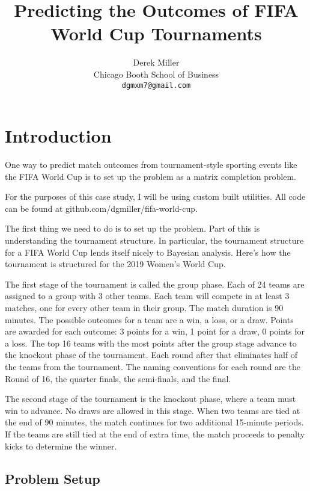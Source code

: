 \documentclass{article}
\title{Predicting the Outcomes of FIFA World Cup Tournaments}
\author{
  Derek Miller \\
  Chicago Booth School of Business\\
  \texttt{dgmxm7@gmail.com} \\
}
\begin{document}
\maketitle

\begin{abstract}
\lipsum[1]
\end{abstract}




\section{Introduction}
One way to predict match outcomes from tournament-style sporting events like the FIFA World Cup is to set up the problem as a matrix completion problem.

For the purposes of this case study, I will be using custom built utilities. All code can be found at github.com/dgmiller/fifa-world-cup.

The first thing we need to do is to set up the problem. Part of this is understanding the tournament structure. In particular, the tournament structure for a FIFA World Cup lends itself nicely to Bayesian analysis. Here's how the tournament is structured for the 2019 Women's World Cup.

The first stage of the tournament is called the group phase. Each of 24 teams are assigned to a group with 3 other teams. Each team will compete in at least 3 matches, one for every other team in their group. The match duration is 90 minutes. The possible outcomes for a team are a win, a loss, or a draw. Points are awarded for each outcome: 3 points for a win, 1 point for a draw, 0 points for a loss. The top 16 teams with the most points after the group stage advance to the knockout phase of the tournament. Each round after that eliminates half of the teams from the tournament. The naming conventions for each round are the Round of 16, the quarter finals, the semi-finals, and the final.

The second stage of the tournament is the knockout phase, where a team must win to advance. No draws are allowed in this stage. When two teams are tied at the end of 90 minutes, the match continues for two additional 15-minute periods. If the teams are still tied at the end of extra time, the match proceeds to penalty kicks to determine the winner.

\subsection{Problem Setup}
\end{document}
